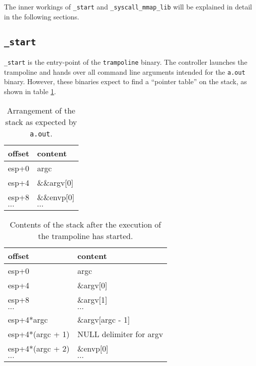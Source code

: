 \documentclass[draft,final]{vutinfth} %
\begin{document}
The inner workings of \texttt{\_start} and \texttt{\_syscall\_mmap\_lib} will be explained in detail in the following sections.

\subsection{\texttt{\_start}}

\texttt{\_start} is the entry-point of the \texttt{trampoline} binary. The controller launches the trampoline and hands over all command line arguments intended for the \texttt{a.out} binary. However, these binaries expect to find a ``pointer table'' on the stack\cite[lines 54-59]{BinfmtAoutC}, as shown in table \ref{tab:expected_stack}.

\begin{table}[H]
    \centering
    \begin{tabular}{|l|l|}\hline
    offset & content       \\ \hline\hline
    esp+0  & argc          \\ \hline
    esp+4  & \&\&argv{[}0{]} \\ \hline
    esp+8  & \&\&envp{[}0{]} \\ \hline
    $\cdots$ & $\cdots$ \\ \hline
    \end{tabular}
    \caption{Arrangement of the stack as expected by \texttt{a.out}.}
    \label{tab:expected_stack}
\end{table}

\begin{table}[H]
    \centering
    \begin{tabular}{|l|l|}
    \hline
    offset & content       \\ \hline\hline
    esp+0  & argc          \\ \hline
    esp+4  & \&argv{[}0{]} \\ \hline
    esp+8  & \&argv{[}1{]} \\ \hline
    $\cdots$ & $\cdots$ \\ \hline
    esp+4*argc  & \&argv{[}argc - 1{]} \\ \hline
    esp+4*(argc + 1)  & NULL delimiter for argv \\ \hline
    esp+4*(argc + 2)  & \&envp{[}0{]} \\ \hline
    $\cdots$ & $\cdots$ \\ \hline
    \end{tabular}
    \caption{Contents of the stack after the execution of the trampoline has started.}
    \label{tab:given_stack}
\end{table}
\end{document}
